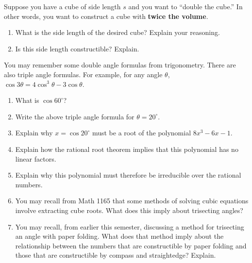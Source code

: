 \begin{prob}
Suppose you have a cube of side length $s$ and you want to ``double the cube.''  In other words, you want to construct a cube with \textbf{twice the volume}.  
\begin{enumerate}
\item What is the side length of the desired cube?  Explain your reasoning. 
\item Is this side length constructible?  Explain.  
\end{enumerate}
\end{prob}

\begin{prob}
You may remember some double angle formulas from trigonometry.  There are also triple angle formulas.  For example, for any angle $\theta$,  $\cos3\theta=4\cos^3\theta -3\cos\theta$.  
\begin{enumerate}
\item What is $\cos60^\circ$?
\item Write the above triple angle formula for $\theta = 20^\circ$.  %
\item Explain why $x = \cos20^\circ$ must be a root of the polynomial $8x^3-6x-1$.  
\item Explain how the rational root theorem implies that this polynomial has no linear factors.  
\item Explain why this polynomial must therefore be irreducible over the rational numbers.  
\item You may recall from Math 1165 that some methods of solving cubic equations involve extracting cube roots.  What does this imply about trisecting angles?  
\item You may recall, from earlier this semester, discussing a method for trisecting an angle with paper folding.  What does that method imply about the relationship between the numbers that are constructible by paper folding and those that are constructible by compass and straightedge?  Explain.  
\end{enumerate}
\end{prob}

